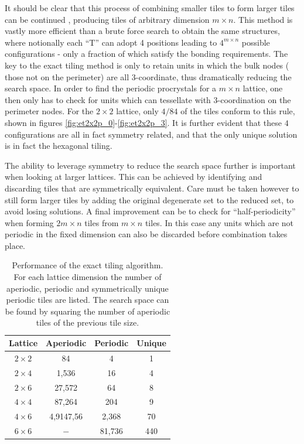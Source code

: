 It should be clear that this process of combining smaller tiles to form larger tiles can be continued \adinfinitum{}, producing tiles of arbitrary dimension $m\times n$.
This method is vastly more efficient than a brute force search to obtain the same structures, where notionally each ``T'' can adopt 4 positions leading to $4^{m\times n}$ possible configurations - only a fraction of which satisfy the bonding requirements.
The key to the exact tiling method is only to retain units in which the bulk nodes (\ie{} those not on the perimeter) are all 3\--coordinate, thus dramatically reducing the search space.
In order to find the periodic procrystals for a $m\times n$ lattice, one then only has to check for units which can tessellate with $3$\--coordination on the perimeter nodes.
For the $2\times 2$ lattice, only $4 / 84$ of the tiles conform to this rule, shown in figures \ref{fig:et2x2p_0}\--\ref{fig:et2x2p_3}.
It is further evident that these $4$ configurations are all in fact symmetry related, and that the only unique solution is in fact the hexagonal tiling.

The ability to leverage symmetry to reduce the search space further is important when looking at larger lattices. 
This can be achieved by identifying and discarding tiles that are symmetrically equivalent.
Care must be taken however to still form larger tiles by adding the original degenerate set to the reduced set, to avoid losing solutions.
A final improvement can be to check for ``half\--periodicity'' when forming $2m\times n$ tiles from $m\times n$ tiles. 
In this case any units which are not periodic in the fixed dimension can also be discarded before combination takes place.

\begin{table}[bt]
	\centering
     \caption{Performance of the exact tiling algorithm. For each lattice dimension the number of aperiodic, periodic and symmetrically unique periodic tiles are listed. The search space can be found by squaring the number of aperiodic tiles of the previous tile size. }
     \label{tab:exacttiling}
     \begin{tabular}{cccc}
     \toprule
     Lattice & Aperiodic & Periodic & Unique \\
     \midrule
	 $2\times 2$ & 84 & 4 & 1 \\
	 $2\times 4$ & 1,536 & 16 & 4 \\	
	 $2\times 6$ & 27,572 & 64 & 8 \\	
	 $4\times 4$ & 87,264 & 204 & 9 \\
	 $4\times 6$ & 4,9147,56 & 2,368 & 70  \\
	 $6\times 6$ & $-$ & 81,736 & 440  \\
     \bottomrule
     \end{tabular}
\end{table}

